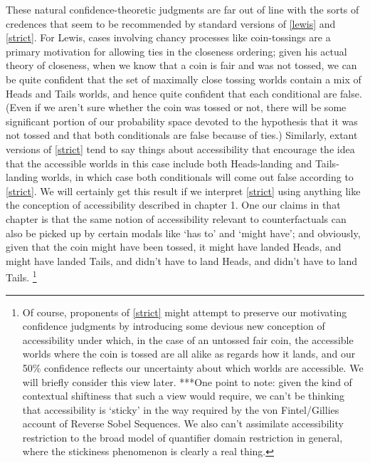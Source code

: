 \documentclass[If.tex]{subfiles}
\begin{document}
These natural confidence-theoretic judgments are far out of line with the sorts of credences that seem to be recommended by standard versions of \ref{lewis} and \ref{strict}. For Lewis, cases involving chancy processes like coin-tossings are a primary motivation for allowing ties in the closeness ordering; given his actual theory of closeness, when we know that a coin is fair and was not tossed, we can be quite confident that the set of maximally close tossing worlds contain a mix of Heads and Tails worlds, and hence quite confident that each conditional are false. (Even if we aren't sure whether the coin was tossed or not, there will be some significant portion of our probability space devoted to the hypothesis that it was not tossed and that both conditionals are false because of ties.) Similarly, extant versions of \ref{strict} tend to say things about accessibility that encourage the idea that the accessible worlds in this case include both Heads-landing and Tails-landing worlds, in which case both conditionals will come out false according to \ref{strict}. We will certainly get this result if we interpret \ref{strict} using anything like the conception of accessibility described in chapter 1. One our claims in that chapter is that the same notion of accessibility relevant to counterfactuals can also be picked up by certain modals like ‘has to’ and ‘might have’; and obviously, given that the coin might have been tossed, it might have landed Heads, and might have landed Tails, and didn't have to land Heads, and didn't have to land Tails.%
\footnote{Of course, proponents of \ref{strict} might attempt to preserve our motivating confidence judgments by introducing some devious new conception of accessibility under which, in the case of an untossed fair coin, the accessible worlds where the coin is tossed are all alike as regards how it lands, and our 50\% confidence reflects our uncertainty about which worlds are accessible. We will briefly consider this view later.  ***One point to note: given the kind of contextual shiftiness that such a view would require, we can't be thinking that accessibility is ‘sticky’ in the way required by the von Fintel/Gillies account of Reverse Sobel Sequences. We also can't assimilate accessibility restriction to the broad model of quantifier domain restriction in general, where the stickiness phenomenon is clearly a real thing.}
\end{document}
